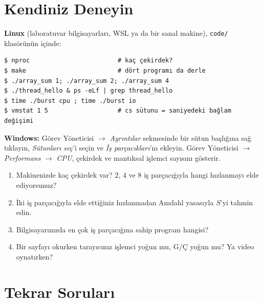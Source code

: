 \documentclass[11pt,a4paper]{article}
\begin{document}
\section{Kendiniz Deneyin}

\begin{tryit}
\textbf{Linux} (laboratuvar bilgisayarları, WSL ya da bir sanal makine), \texttt{code/} klasörünün içinde:
\begin{lstlisting}[style=term]
$ nproc                        # kaç çekirdek?
$ make                         # dört programı da derle
$ ./array_sum 1; ./array_sum 2; ./array_sum 4
$ ./thread_hello & ps -eLf | grep thread_hello
$ time ./burst cpu ; time ./burst io
$ vmstat 1 5                   # cs sütunu = saniyedeki bağlam değişimi
\end{lstlisting}
\textbf{Windows:} Görev Yöneticisi $\to$ \emph{Ayrıntılar} sekmesinde bir sütun başlığına sağ tıklayın, \emph{Sütunları seç}'i seçin ve \emph{İş parçacıkları}'nı ekleyin. Görev Yöneticisi $\to$ \emph{Performans} $\to$ \emph{CPU}, çekirdek ve mantıksal işlemci sayısını gösterir.
\begin{enumerate}[leftmargin=1.4em]
  \item Makinenizde kaç çekirdek var? $2$, $4$ ve $8$ iş parçacığıyla hangi hızlanmayı elde ediyorsunuz?
  \item İki iş parçacığıyla elde ettiğiniz hızlanmadan Amdahl yasasıyla $S$'yi tahmin edin.
  \item Bilgisayarınızda en çok iş parçacığına sahip program hangisi?
  \item Bir sayfayı okurken tarayıcınız işlemci yoğun mu, G/Ç yoğun mu? Ya video oynatırken?
\end{enumerate}
\end{tryit}

\section{Tekrar Soruları}
\end{document}

